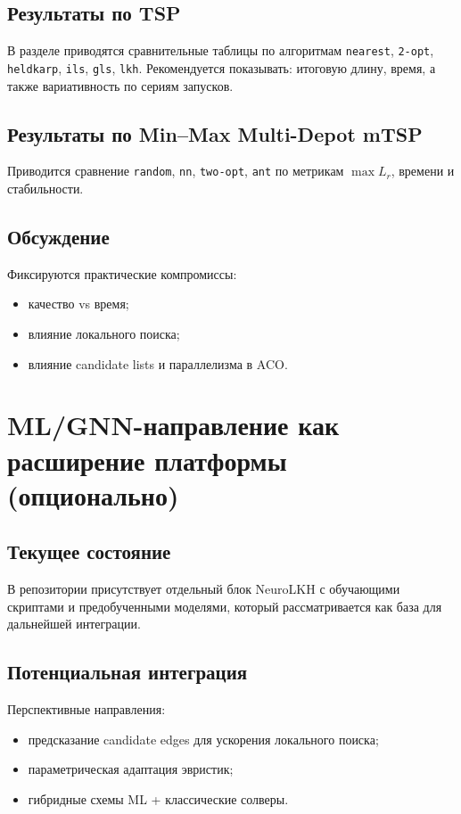 \documentclass[a4paper,12pt]{extarticle}
\begin{document}
\subsection{Результаты по TSP}
В разделе приводятся сравнительные таблицы по алгоритмам \texttt{nearest}, \texttt{2-opt}, \texttt{heldkarp}, \texttt{ils}, \texttt{gls}, \texttt{lkh}.
Рекомендуется показывать: итоговую длину, время, а также вариативность по сериям запусков.

\subsection{Результаты по Min--Max Multi-Depot mTSP}
Приводится сравнение \texttt{random}, \texttt{nn}, \texttt{two-opt}, \texttt{ant} по метрикам $\max L_r$, времени и стабильности.

\subsection{Обсуждение}
Фиксируются практические компромиссы:
\begin{itemize}
    \item качество vs время;
    \item влияние локального поиска;
    \item влияние candidate lists и параллелизма в ACO.
\end{itemize}

\pagebreak

\section{ML/GNN-направление как расширение платформы (опционально)}

\subsection{Текущее состояние}
В репозитории присутствует отдельный блок NeuroLKH с обучающими скриптами и предобученными моделями, который рассматривается как база для дальнейшей интеграции.

\subsection{Потенциальная интеграция}
Перспективные направления:
\begin{itemize}
    \item предсказание candidate edges для ускорения локального поиска;
    \item параметрическая адаптация эвристик;
    \item гибридные схемы ML + классические солверы.
\end{itemize}
\end{document}
